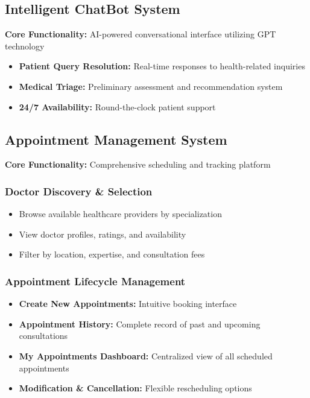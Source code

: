 \documentclass[12pt]{article}
\begin{document}
\subsection{Intelligent ChatBot System}
\textbf{Core Functionality:} AI-powered conversational interface utilizing GPT technology
\begin{itemize}[leftmargin=1cm]
    \item \textbf{Patient Query Resolution:} Real-time responses to health-related inquiries
    \item \textbf{Medical Triage:} Preliminary assessment and recommendation system
    \item \textbf{24/7 Availability:} Round-the-clock patient support
\end{itemize}

\subsection{Appointment Management System}
\textbf{Core Functionality:} Comprehensive scheduling and tracking platform

\subsubsection{Doctor Discovery \& Selection}
\begin{itemize}[leftmargin=1cm]
    \item Browse available healthcare providers by specialization
    \item View doctor profiles, ratings, and availability
    \item Filter by location, expertise, and consultation fees
\end{itemize}

\subsubsection{Appointment Lifecycle Management}
\begin{itemize}[leftmargin=1cm]
    \item \textbf{Create New Appointments:} Intuitive booking interface
    \item \textbf{Appointment History:} Complete record of past and upcoming consultations
    \item \textbf{My Appointments Dashboard:} Centralized view of all scheduled appointments
    \item \textbf{Modification \& Cancellation:} Flexible rescheduling options
\end{itemize}
\end{document}
